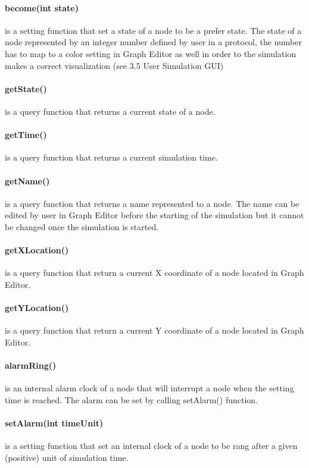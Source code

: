 \paragraph{become(int state)} is a setting function that set a state of a node to be a prefer state. The state of a node represented by an integer number defined by user in a protocol, the number has to map to a color setting in Graph Editor as well in order to the simulation makes a correct visualization (see 3.5 User Simulation GUI)

\paragraph{getState()} is a query function that returns a current state of a node.

\paragraph{getTime()} is a query function that returns a current simulation time.

\paragraph{getName()} is a query function that returns a name represented to a node. The name can be edited by user in Graph Editor before the starting of the simulation but it cannot be changed once the simulation is started.

\paragraph{getXLocation()} is a query function that return a current X coordinate of a node located in Graph Editor.

\paragraph{getYLocation()} is a query function that return a current Y coordinate of a node located in Graph Editor.

\paragraph{alarmRing()} is an internal alarm clock of a node that will interrupt a node when the setting time is reached. The alarm can be set by calling setAlarm() function.

\paragraph{setAlarm(int timeUnit)} is a setting function that set an internal clock of a node to be rang after a given (positive) unit of simulation time.

